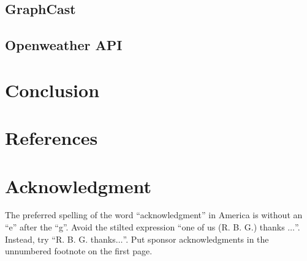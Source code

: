 \documentclass[conference]{IEEEtran}
\begin{document}
\subsection{GraphCast}


\subsection{Openweather API}


\section{Conclusion}


\section{References}


\section*{Acknowledgment}

The preferred spelling of the word ``acknowledgment'' in America is without
an ``e'' after the ``g''. Avoid the stilted expression ``one of us (R. B.
G.) thanks $\ldots$''. Instead, try ``R. B. G. thanks$\ldots$''. Put sponsor
acknowledgments in the unnumbered footnote on the first page.
\end{document}
